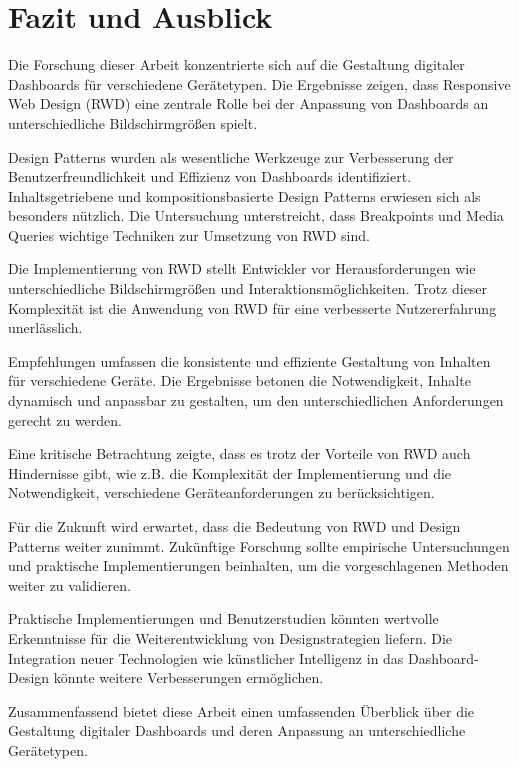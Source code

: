 \section{Fazit und Ausblick}

Die Forschung dieser Arbeit konzentrierte sich auf die Gestaltung digitaler Dashboards für verschiedene Gerätetypen.
Die Ergebnisse zeigen, dass Responsive Web Design (RWD) eine zentrale Rolle bei der Anpassung von Dashboards an unterschiedliche Bildschirmgrößen spielt.

Design Patterns wurden als wesentliche Werkzeuge zur Verbesserung der Benutzerfreundlichkeit und Effizienz von Dashboards identifiziert.
Inhaltsgetriebene und kompositionsbasierte Design Patterns erwiesen sich als besonders nützlich.
Die Untersuchung unterstreicht, dass Breakpoints und Media Queries wichtige Techniken zur Umsetzung von RWD sind.

Die Implementierung von RWD stellt Entwickler vor Herausforderungen wie unterschiedliche Bildschirmgrößen und Interaktionsmöglichkeiten.
Trotz dieser Komplexität ist die Anwendung von RWD für eine verbesserte Nutzererfahrung unerlässlich.

Empfehlungen umfassen die konsistente und effiziente Gestaltung von Inhalten für verschiedene Geräte.
Die Ergebnisse betonen die Notwendigkeit, Inhalte dynamisch und anpassbar zu gestalten, um den unterschiedlichen Anforderungen gerecht zu werden.

Eine kritische Betrachtung zeigte, dass es trotz der Vorteile von RWD auch Hindernisse gibt, wie z.B. die Komplexität der Implementierung und die Notwendigkeit, verschiedene Geräteanforderungen zu berücksichtigen.

Für die Zukunft wird erwartet, dass die Bedeutung von RWD und Design Patterns weiter zunimmt.
Zukünftige Forschung sollte empirische Untersuchungen und praktische Implementierungen beinhalten, um die vorgeschlagenen Methoden weiter zu validieren.

Praktische Implementierungen und Benutzerstudien könnten wertvolle Erkenntnisse für die Weiterentwicklung von Designstrategien liefern.
Die Integration neuer Technologien wie künstlicher Intelligenz in das Dashboard-Design könnte weitere Verbesserungen ermöglichen.

Zusammenfassend bietet diese Arbeit einen umfassenden Überblick über die Gestaltung digitaler Dashboards und deren Anpassung an unterschiedliche Gerätetypen.






